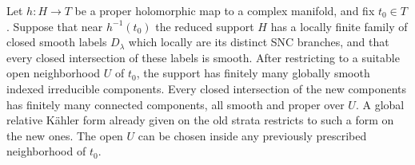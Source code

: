 \begin{lemma}\label{lem:finite-components}
Let \(h:H\to T\) be a proper holomorphic map to a complex manifold, and
fix \(t_0\in T\).  Suppose that near \(h^{-1}(t_0)\) the reduced support
\(H\) has a locally finite family of closed smooth labels \(D_\lambda\)
which locally are its distinct SNC branches, and that every closed
intersection of these labels is smooth.  After restricting to a suitable
open neighborhood \(U\) of \(t_0\), the support has finitely many globally
smooth indexed irreducible components.  Every closed intersection of the
new components has finitely many connected components, all smooth and
proper over \(U\).  A global relative K\"ahler form already given on the
old strata restricts to such a form on the new ones.  The open \(U\) can
be chosen inside any previously prescribed neighborhood of \(t_0\).
\end{lemma}
